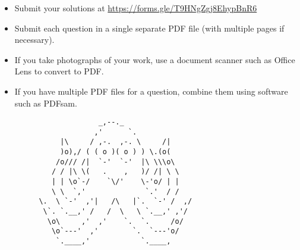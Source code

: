 \documentclass{article}
\begin{document}
\vfill
\begin{itemize}
	\item Submit your solutions at \href{https://forms.gle/T9HNgZgj8EhypBnR6}{https://forms.gle/T9HNgZgj8EhypBnR6}
	\item Submit each question in a single separate PDF file (with multiple pages if necessary).
	\item If you take photographs of your work, use a document scanner such as Office Lens to convert to PDF.
	\item If you have multiple PDF files for a question, combine them using software such as PDFsam.
\end{itemize}

\vfill
\centering
\small
\begin{BVerbatim}
                       _,--._
                      ,'      `.
              |\     / ,-.  ,-. \     /|
              )o),/ ( ( o )( o ) ) \.(o(
             /o/// /|  `-'  `-'  |\ \\\o\
            / / |\ \(   .    ,   )/ /| \ \
            | | \o`-/    `\/'    \-'o/ | |
            \ \  `,'              `.'  / /
         \.  \ `-'  ,'|   /\   |`.  `-' /  ,/
          \`. `.__,' /   /  \   \ `.__,' ,'/
           \o\     ,'  ,'    `.  `.     /o/
            \o`---'  ,'        `.  `---'o/
             `.____,'            `.____,
\end{BVerbatim}
\end{document}
